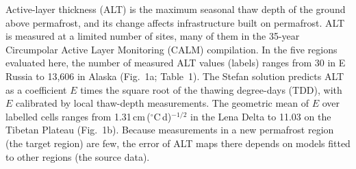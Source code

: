 %

Active-layer thickness (ALT) is the maximum seasonal thaw depth of the ground above permafrost, and its change affects infrastructure built on permafrost\cite{Karjalainen2019,Ran2022b}. ALT is measured at a limited number of sites, many of them in the 35-year Circumpolar Active Layer Monitoring (CALM) compilation\cite{Streletskiy2025}. In the five regions evaluated here, the number of measured ALT values (labels) ranges from 30 in E Russia to 13,606 in Alaska (Fig.~1a; Table~1). The Stefan solution\cite{Stefan1891} predicts ALT as a coefficient $E$ times the square root of the thawing degree-days (TDD), with $E$ calibrated by local thaw-depth measurements\cite{Nelson1997}. The geometric mean of $E$ over labelled cells ranges from 1.31\,cm\,($^{\circ}$C\,d)$^{-1/2}$ in the Lena Delta to 11.03 on the Tibetan Plateau (Fig.~1b). Because measurements in a new permafrost region (the target region) are few, the error of ALT maps there depends on models fitted to other regions (the source data).

